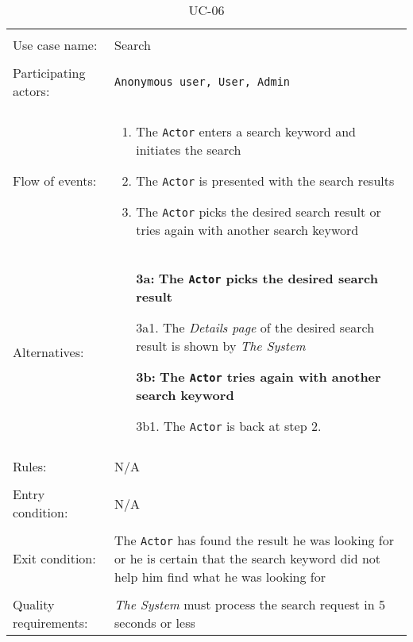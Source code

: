 \noindent
\begin{table}[h!]
\caption{UC-06}
\label{UC-06}
\centering
\begin{tabular}{ l p{8cm} } 
\hline  
\\                   
Use case name:  & Search   \\   \hline \\                
Participating actors:  & \texttt{Anonymous user, User, Admin} \\   \hline \\
Flow of events: & \begin{enumerate}
\item{The \texttt{Actor} enters a search keyword and initiates the search}
\item{The \texttt{Actor} is presented with the search results}
\item{The \texttt{Actor} picks the desired search result or tries again with another search keyword}
\end{enumerate} \\
Alternatives: & \begin{itemize}
\item[\textbf{3a:}] \textbf{The \texttt{Actor} picks the desired search result}
\item[]  3a1. The \textit{Details page} of the desired search result is shown by \textit{The System}
\item[\textbf{3b:}] \textbf{The \texttt{Actor} tries again with another search keyword}
\item[]  3b1. The \texttt{Actor} is back at step 2.
\end{itemize} \\ 
\hline \\
Rules: & N/A \\ \hline \\
Entry condition: & N/A \\ \hline \\
Exit condition: & The \texttt{Actor} has found the result he was looking for or he is certain that the search keyword did not help him find what he was looking for \\ \hline \\
Quality requirements: & \textit{The System} must process the search request in 5 seconds or less \\ \hline           
\end{tabular}
\end{table}

